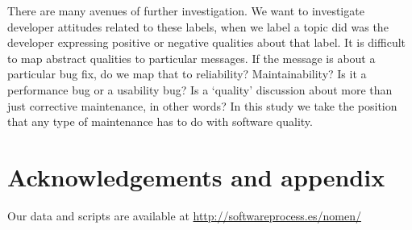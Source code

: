 \documentclass{acm_proc_article-sp}
\newcommand{\XXX}[1]{\textcolor{red}{{\it \textbf{[XXX: #1]}}}}
\begin{document}
There are many avenues of further investigation.  We want to investigate developer attitudes related to these labels, when we label a topic did was the developer expressing positive or negative qualities about that label.  It is difficult to map abstract qualities to particular messages. If the message is about a particular bug fix, do we map that to reliability? Maintainability? Is it a performance bug or a usability bug? Is a `quality' discussion about more than just corrective maintenance, in other words? In this study we take the position that any type of maintenance has to do with software quality.


\section{Acknowledgements and appendix}
Our data and scripts are available at \url{http://softwareprocess.es/nomen/}


%

\end{document}
